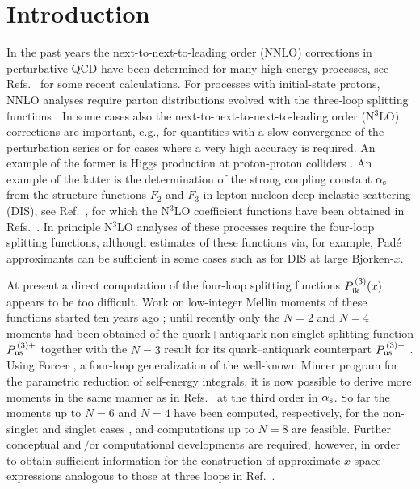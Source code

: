 \documentclass[12pt]{article}
\newcommand{\als}{\alpha_{\rm s}}
\begin{document}
\section{Introduction}
\label{sec:intro}
%
In the past years the next-to-next-to-leading order (NNLO) corrections 
in perturbative QCD have been determined for many high-energy processes, 
see Refs.~\cite{NNLO1,NNLO2,NNLO3,NNLO4,NNLO5,NNLO6,NNLO7,NNLO8}
for some recent calculations.
For processes with initial-state protons, NNLO analyses require parton 
distributions evolved with the three-loop splitting functions 
\cite{mvvPns,mvvPsg}.
In some cases also the next-to-next-to-next-to-leading order (N$^3$LO)
corrections are important, e.g., for quantities with a slow convergence of 
the perturbation series or for cases where a very high accuracy is required.
An example of the former is Higgs production at proton-proton colliders
\cite{Higgs1,Higgs2}.
An example of the latter is the determination of the strong coupling constant
$\als$ from the structure functions $F_2$ and $F_3$ in lepton-nucleon
deep-inelastic scattering (DIS), see Ref.~\cite{ABMas15},
for which the N$^3$LO coefficient functions have been obtained in Refs.\
\cite{mvvF2L,mvvF3}.
In principle N$^3$LO analyses of these processes require the four-loop 
splitting functions, although estimates of these functions via, for example, 
Pad\'{e} approximants can be sufficient in some cases such as for DIS at 
large Bjorken-$x$.

At present a direct computation of the four-loop splitting functions 
$P_{\:\!\rm ik}^{\,(3)}(x)$ appears to be too difficult.
Work on low-integer Mellin moments of these functions started ten years 
ago \cite{ChP4ns1}; until recently only the $N=2$ and $N=4$ moments had
been obtained of the quark+antiquark non-singlet splitting function 
$P_{\:\!\rm ns}^{\,(3)+}$ together with the $N=3$ result for its 
quark--antiquark counterpart $P_{\:\!\rm ns}^{\,(3)-}$ 
\cite{VelizN2,VelizN34,ChP4ns2}. 
Using {\sc Forcer} \cite{tuLL2016,FORCER}, a four-loop generalization of the 
well-known {\sc Mincer} program \cite{MINCER1,MINCER2} for the parametric 
reduction of self-energy integrals, it is now possible to derive more moments 
in the same manner as in Refs.~\cite{Mom3loop1,Mom3loop2,Mom3loop3} 
at the third order in $\als$.
So far the moments up to $N=6$ and $N=4$ have been computed, respectively, for 
the non-singlet and singlet cases \cite{avLL2016,RUVV1}, and computations up
to $N=8$ are feasible.
Further conceptual and$\:\!/$or computational developments are required, however,
in order to obtain sufficient information for the construction of approximate 
$x$-space expressions analogous to those at three loops in Ref.~\cite{NVappr}.
\end{document}
